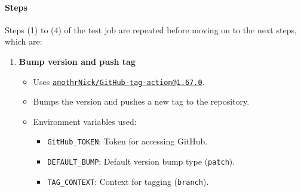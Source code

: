 \paragraph{Steps}
Steps (1) to (4) of the test job are repeated before moving on to the next steps, which are:
\begin{enumerate}
    \item \textbf{Bump version and push tag}
    \begin{itemize}
        \item Uses \href{https://GitHub.com/marketplace/actions/GitHub-tag-bump}{\texttt{anothrNick/GitHub-tag-action@1.67.0}}.
        \item Bumps the version and pushes a new tag to the repository.
        \item Environment variables used:
        \begin{itemize}
            \item \texttt{GitHub\_TOKEN}: Token for accessing GitHub.
            \item \texttt{DEFAULT\_BUMP}: Default version bump type (\texttt{patch}).
            \item \texttt{TAG\_CONTEXT}: Context for tagging (\texttt{branch}).

\end{itemize}
\end{itemize}
\end{enumerate}
